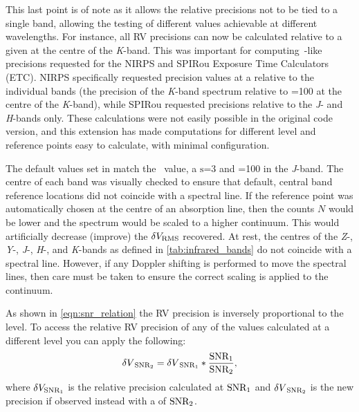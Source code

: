 This last point is of note as it allows the relative precisions not to be tied to a single band, allowing the testing of different \snr{} values achievable at different wavelengths.
For instance, all {RV} precisions can now be calculated relative to a given \snr{} at the centre of the \textit{K}-band.
This was important for computing~\citet{figueira_radial_2016}-like precisions requested for the {NIRPS} and {SPIRou} Exposure Time Calculators ({ETC}).
{NIRPS} specifically requested precision values at a \snr{} relative to the individual bands (the precision of the \emph{K}-band spectrum relative to \snr{}=100 at the centre of the \emph{K}-band), while {SPIRou} requested precisions relative to the \emph{J}- and \emph{H}-bands only.
These calculations were not easily possible in the original code version, and this extension has made computations for different \snr{} level and reference points easy to calculate, with minimal configuration.

The default values set in \eniric{} match the~\citet{figueira_radial_2016} value, a \(\mathrm{s}\)=3 and \snr{}=100 in the \emph{J}-band.
The centre of each band was visually checked to ensure that default, central band reference locations did not coincide with a spectral line.
If the reference point was automatically chosen at the centre of an absorption line, then the counts \(N\) would be lower and the spectrum would be scaled to a higher continuum.
This would artificially decrease (improve) the \(\delta V_{\textrm{RMS}}\) recovered.
At rest, the centres of the \emph{Z}-, \emph{Y}-, \emph{J}-, \emph{H}-, and \emph{K}-bands as defined in \cref{tab:infrared_bands} do not coincide with a spectral line. However, if any Doppler shifting is performed to move the spectral lines, then care must be taken to ensure the correct scaling is applied to the continuum.

As shown in \cref{eqn:snr_relation} the {RV} precision is inversely proportional to the \snr{} level.
To access the relative {RV} precision of any of the values calculated at a different \snr{} level you can apply the following:
\begin{equation}
{\delta V}_{{\textrm{SNR}{}}_{2}} = {\delta V}_{{\textrm{SNR}{}}_{1}} * \frac{{\textrm{SNR}{}}_{1}}{{\textrm{SNR}{}}_{2}},
\end{equation}
where \(\delta {V}_{{\textrm{SNR}{}}_{1}}\) is the relative precision calculated at \({\textrm{SNR}{}}_{1}\) and \({\delta V}_{{\textrm{SNR}{}}_{2}}\) is the new precision if observed instead with a \snr{} of \({\textrm{SNR}{}}_{2}\).


